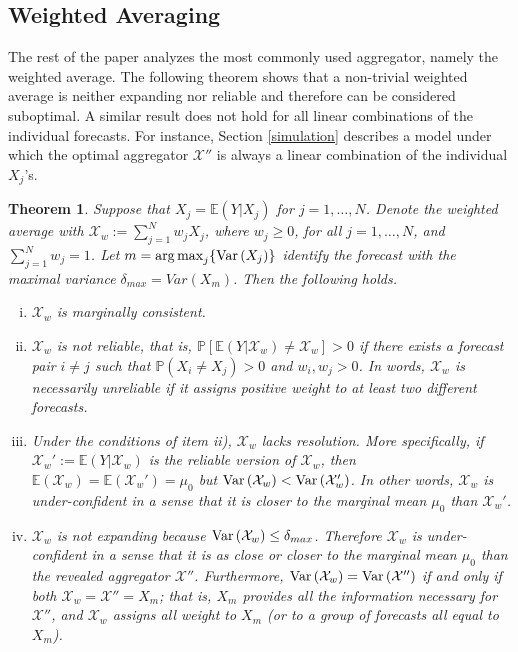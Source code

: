 \documentclass[11pt]{article}
\renewcommand{\P}{\mathbb{P}}
\newcommand{\E}{\mathbb{E}}
\newtheorem{theorem}{Theorem}[section]
\DeclareMathOperator*{\argmax}{arg\,max}
\theoremstyle{definition}
\theoremstyle{definition}
\def\P{{\mathbb P}}
\def\E{{\mathbb E}}
\def\Var{{\rm Var}\,}
\begin{document}
\subsection{Weighted Averaging} \label{contraction}

The rest of the paper analyzes the most commonly used aggregator, namely the weighted average. The following theorem shows that a non-trivial weighted average is neither expanding nor reliable and therefore can be considered suboptimal. A similar result does not hold for all linear combinations of the individual forecasts. For instance, Section \ref{simulation} describes a model under which the optimal aggregator $\mathcal{X}''$ is always a linear combination of the individual $X_j$'s.




\begin{theorem}\label{contraction}
Suppose that $X_j = \E(Y | X_j)$ for $j = 1, \dots, N$. Denote the weighted average with $\mathcal{X}_w := \sum_{j=1}^N w_jX_j$, where  $w_j \geq 0$, for all $j = 1, \dots, N$, and $\sum_{j=1}^N w_j = 1$.  Let $m = \argmax_j \{ \Var(X_j)  \}$ identify the forecast with the maximal variance $\delta_{max} = Var(X_m)$. Then the following holds.
\begin{enumerate}[i)]
\item  $\mathcal{X}_w$ is marginally consistent.

\item $\mathcal{X}_w$ is not reliable, that is, $\P\left[\E(Y | \mathcal{X}_w) \neq \mathcal{X}_w\right] > 0$ if there exists a forecast pair $i \neq j$ such that $\P(X_i \neq X_j) > 0$ and $w_i, w_j > 0$. In words, $\mathcal{X}_w$ is necessarily unreliable if it assigns positive weight to at least two different forecasts. 
 
 \item Under the conditions of item ii), $\mathcal{X}_w$ lacks resolution. More specifically, if $\mathcal{X}_w' :=  \E(Y| \mathcal{X}_w)$ is the reliable version of $\mathcal{X}_w$, then $\E(\mathcal{X}_w) = \E(\mathcal{X}_w') = \mu_0$ but $\Var(\mathcal{X}_w) < \Var(\mathcal{X}_w')$. In other words, $\mathcal{X}_w$ is under-confident in a sense that it is closer to the marginal mean $\mu_0$ than $\mathcal{X}_w'$. \label{underconfA}
 
\item $\mathcal{X}_w$ is not expanding because $\Var(\mathcal{X}_w) \leq \delta_{max}$. Therefore $\mathcal{X}_w$ is under-confident in a sense that it is as close or closer to the marginal mean $\mu_0$ than the revealed aggregator $\mathcal{X}''$.  Furthermore, $\Var(\mathcal{X}_w) = \Var(\mathcal{X}'')$ if and only if both $\mathcal{X}_w = \mathcal{X}'' = X_m$; that is,  $X_m$ provides all the information necessary for $\mathcal{X}''$, and $\mathcal{X}_w$ assigns all weight to $X_m$ (or to a group of forecasts all equal to $X_m$). \label{underconfB}
\end{enumerate}
\end{theorem}
\end{document}
